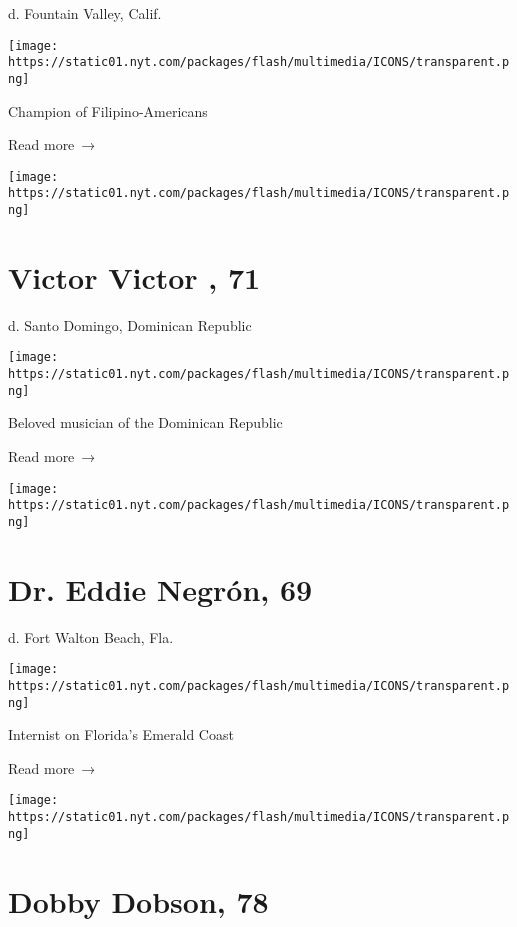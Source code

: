 d. Fountain Valley, Calif.

\texttt{[image: https://static01.nyt.com/packages/flash/multimedia/ICONS/transparent.png]}

Champion of Filipino-Americans

 Read more~→

\href{https://www.nytimes.com/2020/08/01/obituaries/victor-victor-dead-coronavirus.html}{}

\texttt{[image: https://static01.nyt.com/packages/flash/multimedia/ICONS/transparent.png]}

\hypertarget{victor-victor--71}{%
\section{Victor Victor , 71}\label{victor-victor--71}}

d. Santo Domingo, Dominican Republic

\texttt{[image: https://static01.nyt.com/packages/flash/multimedia/ICONS/transparent.png]}

Beloved musician of the Dominican Republic

 Read more~→

\href{https://www.nytimes.com/2020/08/01/obituaries/eddie-negron-dead-coronavirus.html}{}

\texttt{[image: https://static01.nyt.com/packages/flash/multimedia/ICONS/transparent.png]}

\hypertarget{dr-eddie-negruxf3n-69}{%
\section{Dr. Eddie Negrón, 69}\label{dr-eddie-negruxf3n-69}}

d. Fort Walton Beach, Fla.

\texttt{[image: https://static01.nyt.com/packages/flash/multimedia/ICONS/transparent.png]}

Internist on Florida's Emerald Coast

 Read more~→

\href{https://www.nytimes.com/2020/07/31/obituaries/dobby-dobson-dead-coronavirus.html}{}

\texttt{[image: https://static01.nyt.com/packages/flash/multimedia/ICONS/transparent.png]}

\hypertarget{dobby-dobson-78}{%
\section{Dobby Dobson, 78}\label{dobby-dobson-78}}

